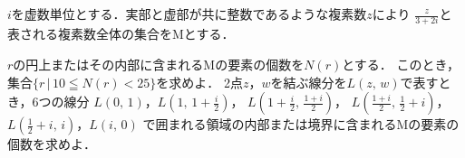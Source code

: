 \documentclass[../../main.tex]{subfiles}
\begin{document}
$i$を虚数単位とする．実部と虚部が共に整数であるような複素数$z$により
$\displaystyle\frac{z}{3+2i}$と表される複素数全体の集合をMとする．
\begin{enumerate}
  $r$の円上またはその内部に含まれるMの要素の個数を$N(r)$とする．
    このとき，集合$\{ r \, | \, 10\leqq N(r) <25 \}$を求めよ．
  2点$z$，$w$を結ぶ線分を$L(z, \, w)$で表すとき，6つの線分
    $L(0, \, 1)$，$\displaystyle L \left( 1, \, 1+\frac{i}{2} \right)$，
    $\displaystyle L \left( 1+\frac{i}{2}, \, \frac{1+i}{2} \right)$，
    $\displaystyle L \left( \frac{1+i}{2}, \, \frac{1}{2}+i \right)$，
    $\displaystyle L \left( \frac{1}{2}+i, \, i \right)$，$L(i, \, 0)$
    で囲まれる領域の内部または境界に含まれるMの要素の個数を求めよ．
\end{enumerate}
\end{document}
